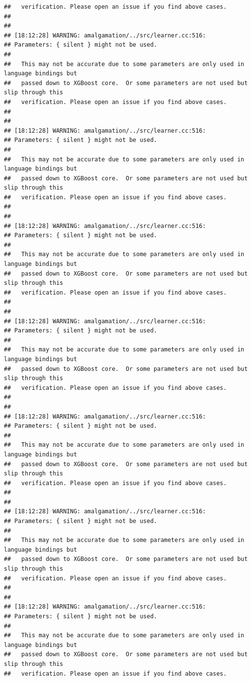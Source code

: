 \documentclass[AMS,STIX2COL]{WileyNJD-v2}\usepackage[]{graphicx}\usepackage[]{color}
\makeatletter
\newenvironment{kframe}{%
 \def\at@end@of@kframe{}%
 \ifinner\ifhmode%
  \def\at@end@of@kframe{\end{minipage}}%
  \begin{minipage}{\columnwidth}%
 \fi\fi%
 \def\FrameCommand##1{\hskip\@totalleftmargin \hskip-\fboxsep
 \colorbox{shadecolor}{##1}\hskip-\fboxsep
     \hskip-\linewidth \hskip-\@totalleftmargin \hskip\columnwidth}%
 \MakeFramed {\advance\hsize-\width
   \@totalleftmargin\z@ \linewidth\hsize
   \@setminipage}}%
 {\par\unskip\endMakeFramed%
 \at@end@of@kframe}
\newenvironment{knitrout}{}{} %
\makeatother
\begin{document}
\begin{knitrout}
\begin{kframe}
\begin{verbatim}
##   verification. Please open an issue if you find above cases.
## 
## 
## [18:12:28] WARNING: amalgamation/../src/learner.cc:516: 
## Parameters: { silent } might not be used.
## 
##   This may not be accurate due to some parameters are only used in language bindings but
##   passed down to XGBoost core.  Or some parameters are not used but slip through this
##   verification. Please open an issue if you find above cases.
## 
## 
## [18:12:28] WARNING: amalgamation/../src/learner.cc:516: 
## Parameters: { silent } might not be used.
## 
##   This may not be accurate due to some parameters are only used in language bindings but
##   passed down to XGBoost core.  Or some parameters are not used but slip through this
##   verification. Please open an issue if you find above cases.
## 
## 
## [18:12:28] WARNING: amalgamation/../src/learner.cc:516: 
## Parameters: { silent } might not be used.
## 
##   This may not be accurate due to some parameters are only used in language bindings but
##   passed down to XGBoost core.  Or some parameters are not used but slip through this
##   verification. Please open an issue if you find above cases.
## 
## 
## [18:12:28] WARNING: amalgamation/../src/learner.cc:516: 
## Parameters: { silent } might not be used.
## 
##   This may not be accurate due to some parameters are only used in language bindings but
##   passed down to XGBoost core.  Or some parameters are not used but slip through this
##   verification. Please open an issue if you find above cases.
## 
## 
## [18:12:28] WARNING: amalgamation/../src/learner.cc:516: 
## Parameters: { silent } might not be used.
## 
##   This may not be accurate due to some parameters are only used in language bindings but
##   passed down to XGBoost core.  Or some parameters are not used but slip through this
##   verification. Please open an issue if you find above cases.
## 
## 
## [18:12:28] WARNING: amalgamation/../src/learner.cc:516: 
## Parameters: { silent } might not be used.
## 
##   This may not be accurate due to some parameters are only used in language bindings but
##   passed down to XGBoost core.  Or some parameters are not used but slip through this
##   verification. Please open an issue if you find above cases.
## 
## 
## [18:12:28] WARNING: amalgamation/../src/learner.cc:516: 
## Parameters: { silent } might not be used.
## 
##   This may not be accurate due to some parameters are only used in language bindings but
##   passed down to XGBoost core.  Or some parameters are not used but slip through this
##   verification. Please open an issue if you find above cases.

\end{verbatim}
\end{kframe}
\end{knitrout}
\end{document}
